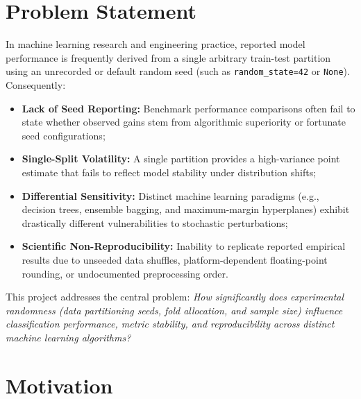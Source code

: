 \section{Problem Statement}
\label{sec:problem_statement}

In machine learning research and engineering practice, reported model performance is frequently derived from a single arbitrary train-test partition using an unrecorded or default random seed (such as \texttt{random\_state=42} or \texttt{None}). Consequently:
\begin{itemize}
    \item \textbf{Lack of Seed Reporting:} Benchmark performance comparisons often fail to state whether observed gains stem from algorithmic superiority or fortunate seed configurations;
    \item \textbf{Single-Split Volatility:} A single partition provides a high-variance point estimate that fails to reflect model stability under distribution shifts;
    \item \textbf{Differential Sensitivity:} Distinct machine learning paradigms (e.g., decision trees, ensemble bagging, and maximum-margin hyperplanes) exhibit drastically different vulnerabilities to stochastic perturbations;
    \item \textbf{Scientific Non-Reproducibility:} Inability to replicate reported empirical results due to unseeded data shuffles, platform-dependent floating-point rounding, or undocumented preprocessing order.
\end{itemize}

This project addresses the central problem: \textit{How significantly does experimental randomness (data partitioning seeds, fold allocation, and sample size) influence classification performance, metric stability, and reproducibility across distinct machine learning algorithms?}

\section{Motivation}
\label{sec:motivation}

